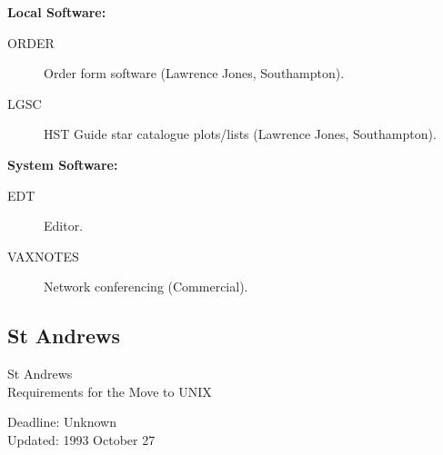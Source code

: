 \begin{center}
{\bf Local Software:}
\end{center}

\begin{description}
\item[ORDER] Order form software (Lawrence Jones, Southampton).
\item[LGSC] HST Guide star catalogue plots/lists (Lawrence Jones,
Southampton).
\end{description}


\begin{center}
{\bf System Software:}
\end{center}
\begin{description}
\item[EDT] Editor.
\item[VAXNOTES] Network conferencing (Commercial).
\end{description}


\newpage
\subsection{St Andrews}

\renewcommand{\starsitename}{St Andrews}
\renewcommand{\starnodename}{SASTAR}

\renewcommand{\starunixdate}{Unknown}
\renewcommand{\starupdate}{1993 October 27}

\renewcommand{\starsitetelephone}{0334 76161 Ext. 8323}
\renewcommand{\starsitefax}{0334 74487}

\begin{center}
{\Large\sc \starsitename \\ [2ex]
           Requirements for the Move to UNIX}

\vspace{3mm}
{\large\sc Deadline: \starunixdate \\ [1ex]
           Updated: \starupdate}
\end{center}

\vspace{10mm}

